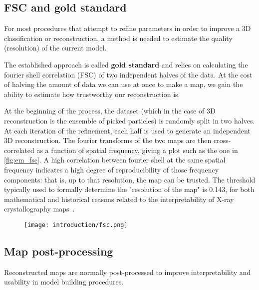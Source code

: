\subsection{FSC and gold standard}\label{em_fsc}
For most procedures that attempt to refine parameters in order to improve a 3D classification or reconstruction, a method is needed to estimate the quality (resolution) of the current model.

The established approach is called \textbf{gold standard} and relies on calculating the fourier shell correlation (FSC) of two independent halves of the data.
At the cost of halving the amount of data we can use at once to make a map, we gain the ability to estimate how trustworthy our reconstruction is.

At the beginning of the process, the dataset (which in the case of 3D reconstruction is the ensemble of picked particles) is randomly split in two halves.
At each iteration of the refinement, each half is used to generate an independent 3D reconstruction.
The fourier transforms of the two maps are then cross-correlated as a function of spatial frequency, giving a plot such as the one in \autoref{fig:em_fsc}.
A high correlation between fourier shell at the same spatial frequency indicates a high degree of reproducibility of those frequency components: that is, up to that resolution, the map can be trusted.
The threshold typically used to formally determine the "resolution of the map" is 0.143, for both mathematical and historical reasons related to the interpretability of X-ray crystallography maps~\cite{rosenthalOptimalDeterminationParticle2003}.

\begin{figure}[ht]
    \centering
    \texttt{[image: introduction/fsc.png]}
    \label{fig:em_fsc}
\end{figure}

\subsection{Map post-processing}
Reconstructed maps are normally post-processed to improve interpretability and usability in model building procedures.

